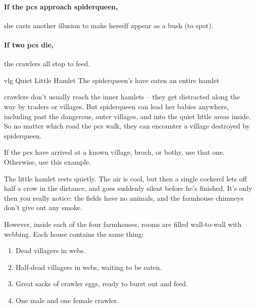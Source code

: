 
\paragraph{If the \glspl{pc} approach \gls{spiderqueen},}
she casts another illusion to make herself appear as a bush (\tn[10] to spot).

\paragraph{If two \glspl{pc} die,}
the \glspl{crawler} all stop to feed.


{\gls{vlg} Quiet Little Hamlet}%
{The \gls{spiderqueen}'s  have eaten an entire hamlet}%

\Glspl{crawler} don't usually reach the inner hamlets -- they get distracted along the way by traders or \glspl{village}.
But \gls{spiderqueen} can lead her babies anywhere, including past the dangerous, outer \glspl{village}, and into the quiet little areas inside.
So no matter which road the \glspl{pc} walk, they can encounter a village destroyed by \gls{spiderqueen}.

If the \glspl{pc} have arrived at a known \gls{village}, \gls{broch}, or \gls{bothy}, use that one.
Otherwise, use this example.

\begin{boxtext}
  The little hamlet rests quietly.
  The air is cool, but then a single cockerel lets off half a crow in the distance, and goes suddenly silent before he's finished.
  It's only then you really notice: the fields have no animals, and the farmhouse chimneys don't give out any smoke.
\end{boxtext}

However, inside each of the four farmhouses, rooms are filled wall-to-wall with webbing.  Each house contains the same thing:

\begin{enumerate}
  \item
  Dead villagers in webs.
  \item
  Half-dead villagers in webs, waiting to be eaten.
  \item
  Great sacks of \gls{crawler} eggs, ready to burst out and feed.
  \item
    One male and one female \gls{crawler}.
\end{enumerate}

